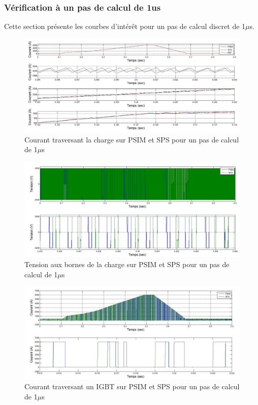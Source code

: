 \documentclass[11pt,letterpaper,final]{report}
\begin{document}
\clearpage
\subsubsection{Vérification à un pas de calcul de 1us}
Cette section présente les courbes d'intérêt pour un pas de calcul discret de 1$\mu$s.


\begin{figure}[htb]
\centering
\includegraphics[scale=0.5]{Fig/DCPDCN/DCPCourantCharge1u.jpg}
\caption{Courant traversant la charge sur PSIM et SPS pour un pas de calcul de 1$\mu$s}
\label{DC_ch_cou_1}
\end{figure}


\begin{figure}[htb]
\centering
\includegraphics[scale=0.5]{Fig/DCPDCN/DCPTensionCharge1u.jpg}
\caption{Tension aux bornes de la charge sur PSIM et SPS pour un pas de calcul de 1$\mu$s}
\label{DC_ch_ten_1}
\end{figure}


\begin{figure}[htb]
\centering
\includegraphics[scale=0.5]{Fig/DCPDCN/DCPCourantIGBT1u.jpg}
\caption{Courant traversant un IGBT sur PSIM et SPS pour un pas de calcul de 1$\mu$s}
\label{DC_IG_cou_1}
\end{figure}
\end{document}
